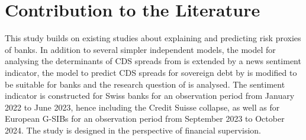 %


\section{Contribution to the Literature}

This study builds on existing studies about explaining and predicting risk proxies of banks. In addition to several simpler independent models, the model for analysing the determinants of CDS spreads from \cite{annaert2013} is extended by a news sentiment indicator, the model to predict CDS spreads for sovereign debt by \cite{cathcart2020} is modified to be suitable for banks and the research question of \cite{roeder2020} is analysed. The sentiment indicator is constructed for Swiss banks for an observation period from January 2022 to June 2023, hence including the Credit Suisse collapse, as well as for European G-SIBs for an observation period from September 2023 to October 2024. The study is designed in the perspective of financial supervision.

\cleardoublepage
